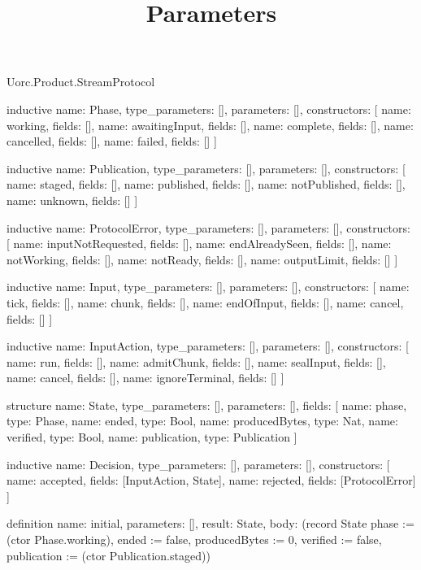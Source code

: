 \begin{lexlean}{Uorc.Product.StreamProtocol}
\title{Parameters}
\begin{semanticmodule}
inductive{
  name: Phase,
  type_parameters: [],
  parameters: [],
  constructors: [
    {name: working, fields: []},
    {name: awaitingInput, fields: []},
    {name: complete, fields: []},
    {name: cancelled, fields: []},
    {name: failed, fields: []}
  ]
}

inductive{
  name: Publication,
  type_parameters: [],
  parameters: [],
  constructors: [
    {name: staged, fields: []},
    {name: published, fields: []},
    {name: notPublished, fields: []},
    {name: unknown, fields: []}
  ]
}

inductive{
  name: ProtocolError,
  type_parameters: [],
  parameters: [],
  constructors: [
    {name: inputNotRequested, fields: []},
    {name: endAlreadySeen, fields: []},
    {name: notWorking, fields: []},
    {name: notReady, fields: []},
    {name: outputLimit, fields: []}
  ]
}

inductive{
  name: Input,
  type_parameters: [],
  parameters: [],
  constructors: [
    {name: tick, fields: []},
    {name: chunk, fields: []},
    {name: endOfInput, fields: []},
    {name: cancel, fields: []}
  ]
}

inductive{
  name: InputAction,
  type_parameters: [],
  parameters: [],
  constructors: [
    {name: run, fields: []},
    {name: admitChunk, fields: []},
    {name: sealInput, fields: []},
    {name: cancel, fields: []},
    {name: ignoreTerminal, fields: []}
  ]
}

structure{
  name: State,
  type_parameters: [],
  parameters: [],
  fields: [
    {name: phase, type: Phase},
    {name: ended, type: Bool},
    {name: producedBytes, type: Nat},
    {name: verified, type: Bool},
    {name: publication, type: Publication}
  ]
}

inductive{
  name: Decision,
  type_parameters: [],
  parameters: [],
  constructors: [
    {name: accepted, fields: [InputAction, State]},
    {name: rejected, fields: [ProtocolError]}
  ]
}

definition{
  name: initial,
  parameters: [],
  result: State,
  body: (record State {phase := (ctor Phase.working), ended := false, producedBytes := 0, verified := false, publication := (ctor Publication.staged)})
}


\end{semanticmodule}
\end{lexlean}
